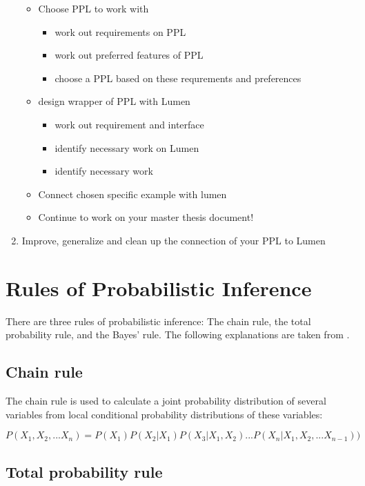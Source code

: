 \documentclass{article}
\begin{document}
\begin{enumerate}
\begin{itemize}
		\item Choose PPL to work with
		\begin {itemize}
		\item work out requirements on PPL
		\item work out preferred features of PPL
		\item choose a PPL based on these requrements and preferences
	\end{itemize}
	\item design wrapper of PPL with Lumen
	\begin{itemize}
		\item work out requirement and interface
		\item identify necessary work on Lumen
		\item identify necessary work
	\end{itemize}
	\item Connect chosen specific example with lumen
	\item Continue to work on your master thesis document!
\end{itemize}
\item Improve, generalize and clean up the connection of your PPL to Lumen
\end{enumerate}

\section{Rules of Probabilistic Inference}

There are three rules of probabilistic inference: The chain rule, the total probability rule, and the Bayes' rule. The following explanations are taken from \cite{9781617292330}.

\subsection{Chain rule}

The chain rule is used to calculate a \gls{joint probability distribution} of several variables from local \gls{conditional probability distribution}s of these variables:

\begin{equation}
  P(X_1 ,X_2 ,...X_n ) = P(X_1 )P(X_2 | X_1 )P(X_3 | X_1 ,X_2 )...P(X_n | X_1 ,X_2 ,...X_{n-1}) )
\end{equation}

\subsection{Total probability rule}
\end{document}
